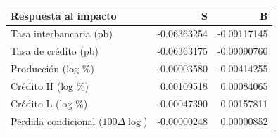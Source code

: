 \begin{tabular}{lrr}\toprule
Respuesta al impacto & S & B\\\midrule
Tasa interbancaria (pb) & -0.06363254 & -0.09117145\\
Tasa de crédito (pb) & -0.06363175 & -0.09090760\\
Producción (log \%) & -0.00003580 & -0.00414255\\
Crédito H (log \%) & 0.00109518 & 0.00084065\\
Crédito L (log \%) & -0.00047390 & 0.00157811\\
Pérdida condicional ($100\Delta\log$) & -0.00000248 & 0.00000852\\
\bottomrule\end{tabular}
